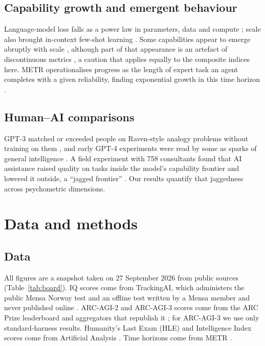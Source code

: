 \documentclass[11pt]{article}
\begin{document}
\subsection{Capability growth and emergent behaviour}
Language-model loss falls as a power law in parameters, data and compute \citep{kaplan2020,hoffmann2022}; scale also brought in-context few-shot learning \citep{brown2020}. Some capabilities appear to emerge abruptly with scale \citep{wei2022}, although part of that appearance is an artefact of discontinuous metrics \citep{schaeffer2023}, a caution that applies equally to the composite indices here. METR operationalises progress as the length of expert task an agent completes with a given reliability, finding exponential growth in this time horizon \citep{kwa2025}.

\subsection{Human--AI comparisons}
GPT-3 matched or exceeded people on Raven-style analogy problems without training on them \citep{webb2023}, and early GPT-4 experiments were read by some as sparks of general intelligence \citep{bubeck2023}. A field experiment with 758 consultants found that AI assistance raised quality on tasks inside the model's capability frontier and lowered it outside, a ``jagged frontier'' \citep{dellacqua2023}. Our results quantify that jaggedness across psychometric dimensions.

\section{Data and methods}
\subsection{Data}
All figures are a snapshot taken on 27 September 2026 from public sources (Table~\ref{tab:board}). IQ scores come from TrackingAI, which administers the public Mensa Norway test and an offline test written by a Mensa member and never published online \citep{trackingai,binaryverse2026}. ARC-AGI-2 and ARC-AGI-3 scores come from the ARC Prize leaderboard and aggregators that republish it \citep{arcagi2,arcagi3,benchlm2026,llmlearner2026}; for ARC-AGI-3 we use only standard-harness results. Humanity's Last Exam (HLE) \citep{hle2025} and Intelligence Index scores come from Artificial Analysis \citep{aa2026}. Time horizons come from METR \citep{kwa2025,metrth}.
\end{document}
